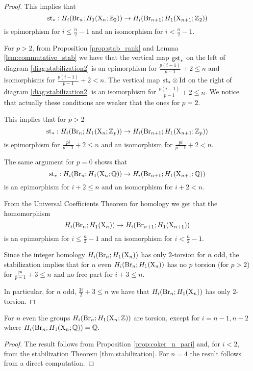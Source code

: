 \begin{proof}
This implies that $$
\mathrm{st}_*:H_i(\operatorname{Br}_n; H_1(\mathrm{X}_n; \mathbb{Z}_2)) \to H_i(\operatorname{Br}_{n+1}; H_1(\mathrm{X}_{n+1}; \mathbb{Z}_2))
$$
is epimorphism for $i \leq \frac{n}{2} -1$
and an isomorphism for $i < \frac{n}{2}-1$. 

For $p>2$, from Proposition \ref{prop:stab_rank} and Lemma \ref{lem:commutative_stab} we have that the vertical map $\mathrm{gst}_*$ on the left of diagram \eqref{diag:stabilization2} is an epimorphism for $\frac{p(i-1)}{p-1}+2 \leq n$ and isomorphisms for $\frac{p(i-1)}{p-1}+2 < n$. The vertical map $\mathrm{st}_* \otimes \mathrm{Id}$ on the right of diagram \eqref{diag:stabilization2} is an isomorphism  for $\frac{p(i-1)}{p-1}+2 \leq n$. We notice that actually these conditions are weaker that the ones for $p=2$.

This implies that for $p>2$ $$
\mathrm{st}_*:H_i(\operatorname{Br}_n; H_1(\mathrm{X}_n; \mathbb{Z}_p)) \to H_i(\operatorname{Br}_{n+1}; H_1(\mathrm{X}_{n+1}; \mathbb{Z}_p))
$$
is epimorphism for $\frac{pi}{p-1}+2 \leq n$
and an isomorphism for $\frac{pi}{p-1}+2 < n$. 

The same argument for $p=0$ shows that
$$
\mathrm{st}_*:H_i(\operatorname{Br}_n; H_1(\mathrm{X}_n; {\mathbb{Q}})) \to H_i(\operatorname{Br}_{n+1}; H_1(\mathrm{X}_{n+1}; {\mathbb{Q}}))
$$
is an epimorphism for $i+2 \leq n$
and an isomorphism for $i+2< n$. 

From the Universal Coefficients Theorem for homology we get that the homomorphism 
$$
H_i(\operatorname{Br}_n; H_1(\mathrm{X}_n)) \to H_i(\operatorname{Br}_{n+1}; H_1(\mathrm{X}_{n+1}))
$$
is an epimorphism for $i \leq \frac{n}{2}-1 $
and an isomorphism for $i < \frac{n}{2}-1$.


Since the integer  homology $H_i(\operatorname{Br}_n; H_1(\mathrm{X}_n))$ has only $2$-torsion for $n$ odd, 
the stabilization implies that for $n$ even $H_i(\operatorname{Br}_n; H_1(\mathrm{X}_n))$ has no $p$ torsion (for $p > 2$) for $\frac{pi}{p-1}+3 \leq n$ and no free part for $i+3 \leq n$.

In particular, for $n$ odd,  $\frac{3i}{2}+3 \leq n$ we have that $H_i(\operatorname{Br}_n; H_1(\mathrm{X}_n))$ has only $2$-torsion.
\end{proof}

\begin{thm}\label{thm:unstable}
For $n$ even the groups $H_i(\operatorname{Br}_n;H_1(\mathrm{X}_n;\mathbb{Z}))$ are torsion, except for $i=n-1, n-2$ where $H_i(\operatorname{Br}_n;H_1(\mathrm{X}_n;{\mathbb{Q}})) = {\mathbb{Q}}.$
\end{thm}
\begin{proof}
The result follows from Proposition \ref{prop:coker_n_pari} and, for $i<2$, from the stabilization Theorem \ref{thm:stabilization}. For $n=4$ the result follows from a direct computation.
\end{proof}

